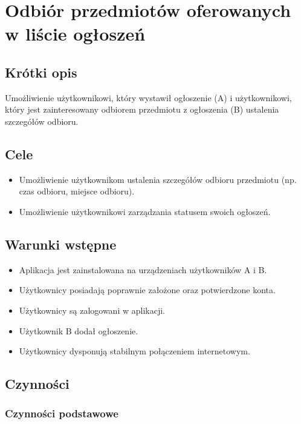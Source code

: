 \documentclass[12pt,a4paper,twoside]{article}
\begin{document}
        \section{Odbiór przedmiotów oferowanych w liście ogłoszeń}

    \subsection{Krótki opis}

    Umożliwienie użytkownikowi, który wystawił ogłoszenie (A) i użytkownikowi, który jest zainteresowany odbiorem przedmiotu z ogłoszenia (B) ustalenia szczegółów odbioru.


    \subsection{Cele}
    \begin{itemize}
        \item Umożliwienie użytkownikom ustalenia szczegółów odbioru przedmiotu (np. czas odbioru, miejsce odbioru).
        \item Umożliwienie użytkownikowi zarządzania statusem swoich ogłoszeń.
    \end{itemize}


    \subsection{Warunki wstępne}
    \begin{itemize}
        \item Aplikacja jest zainstalowana na urządzeniach użytkowników A i B.
        \item Użytkownicy posiadają poprawnie założone oraz potwierdzone konta.
        \item Użytkownicy są zalogowani w aplikacji.
        \item Użytkownik B dodał ogłoszenie.
        \item Użytkownicy dysponują stabilnym połączeniem internetowym.
    \end{itemize}

    \subsection{Czynności}

    \subsubsection{Czynności podstawowe}
\end{document}
